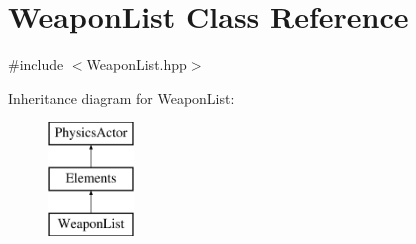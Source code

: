 \hypertarget{class_weapon_list}{\section{Weapon\+List Class Reference}
\label{class_weapon_list}
}


{\ttfamily \#include $<$Weapon\+List.\+hpp$>$}

Inheritance diagram for Weapon\+List\+:\begin{figure}[H]
\begin{center}
\leavevmode
\includegraphics[height=3.000000cm]{class_weapon_list}
\end{center}
\end{figure}
